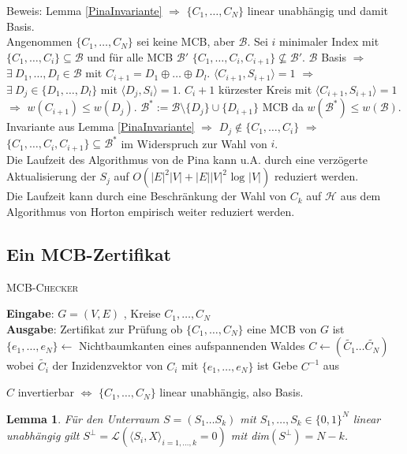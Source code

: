 \documentclass[a4paper,10pt]{scrartcl}
\newcommand{\tbf}{\textbf}
\newcommand{\tsc}{\textsc}
\newcommand{\Ra}{\Rightarrow}
\newcommand{\agn}{\leftarrow}
\newcommand{\Gr}{$G = (V,E)$ }
\newcommand{\Lra}{\Leftrightarrow}
\newcommand{\calB}{\mathcal{B}}
\newcommand{\calH}{\mathcal{H}}
\newcommand{\calL}{\mathcal{L}}
\newcommand{\Eingabe}[1]{\STATE \tbf{Eingabe}: #1 \\}
\newcommand{\Ausgabe}[1]{\STATE \tbf{Ausgabe}: #1 \\}
\newtheorem{lemma}{Lemma}
\begin{document}
Beweis: Lemma \ref{PinaInvariante} $\Ra$ $\{C_1, \ldots, C_N\}$ linear unabhängig und damit Basis. \\
Angenommen $\{C_1, \ldots, C_N\}$ sei keine MCB, aber $\calB$. Sei $i$ minimaler Index mit $\{C_1, \ldots, C_i\} \subseteq \calB$ und für alle MCB $\calB'$ $\{C_1, \ldots, C_i, C_{i+1}\} \nsubseteq \calB'$. $\calB$ Basis $\Ra$ $\exists \ D_1, \ldots, D_l \in \calB$ mit $C_{i+1} = D_1 \oplus \ldots \oplus D_l$. $\langle C_{i+1}, S_{i+1} \rangle = 1$ $\Ra$ $\exists \ D_j \in \{D_1, \ldots, D_l\}$ mit $\langle D_j, S_i \rangle = 1$. $C_i+1$ kürzester Kreis mit $\langle C_{i+1}, S_{i+1} \rangle = 1$ $\Ra$ $w(C_{i+1}) \leq w(D_j)$. $\calB^* := \calB \setminus \{D_j\} \cup \{D_{i+1}\}$ MCB da $w(\calB^*) \leq w(\calB)$. Invariante aus Lemma \ref{PinaInvariante} $\Ra$ $D_j \not \in \{C_1, \ldots, C_i\}$ $\Ra$ $\{C_1, \ldots, C_i, C_{i+1}\} \subseteq \calB^*$ im Widerspruch zur Wahl von $i$. \\

Die Laufzeit des Algorithmus von \textsf{de Pina} kann u.A. durch eine verzögerte Aktualisierung der $S_j$ auf $O(|E|^2 |V| + |E||V|^2 \text{ log } |V|)$ reduziert werden. \\

Die Laufzeit kann durch eine Beschränkung der Wahl von $C_k$ auf $\calH$ aus dem Algorithmus von \textsf{Horton} empirisch weiter reduziert werden. \\

\subsection{Ein MCB-Zertifikat}
\begin{algorithm}
\caption{\tsc{MCB-Checker}}
\begin{algorithmic}
\Eingabe{\Gr, Kreise $C_1, \ldots, C_N$}
\Ausgabe{Zertifikat zur Prüfung ob $\{C_1, \ldots, C_N\}$ eine MCB von $G$ ist}
\STATE $\{e_1, \ldots, e_N\} \agn$ Nichtbaumkanten eines aufspannenden Waldes
\STATE $C \agn (\tilde{C_1} \ldots \tilde{C_N})$ wobei $\tilde{C_i}$ der Inzidenzvektor von $C_i$ mit $\{e_1, \ldots, e_N\}$ ist
\STATE Gebe $C^{-1}$ aus
\end{algorithmic}
\end{algorithm}

$C$ invertierbar $\Lra$ $\{C_1, \ldots, C_N\}$ linear unabhängig, also Basis. \\

\begin{lemma}\label{OrthogonaleKreisraumDimension}
 Für den Unterraum $S = (S_1 \ldots S_k)$ mit $S_1, \ldots, S_k \in \{0,1\}^N$ linear unabhängig gilt $S^\bot = \calL(\langle S_i, X \rangle_{i=1,\ldots,k} = 0)$ mit dim$(S^\bot) = N - k$.
\end{lemma}
\end{document}
